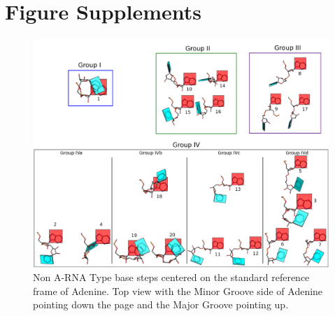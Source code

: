 \chapter{Figure Supplements}
\label{supplements}

\begin{figure}
\centering
\includegraphics[angle=90, scale=0.5]{Supplement/collage2.png}
\caption{Non A-RNA Type base steps centered on the standard reference
  frame of Adenine. Top view with the Minor Groove side of Adenine
  pointing down the page and the Major Groove pointing up.}
\label{fig:steps2}
\end{figure}

